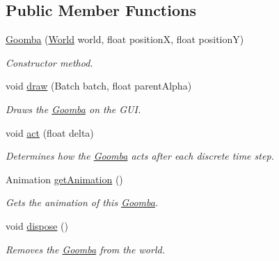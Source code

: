 \subsection*{Public Member Functions}
\begin{DoxyCompactItemize}
\item 
\hyperlink{classnl_1_1arjanfrans_1_1mario_1_1model_1_1Goomba_a71ffe3210dc6f4cfb0ea89ef714d5b2c}{Goomba} (\hyperlink{classnl_1_1arjanfrans_1_1mario_1_1model_1_1World}{World} world, float positionX, float positionY)
\begin{DoxyCompactList}\small\item\em Constructor method. \end{DoxyCompactList}\item 
void \hyperlink{classnl_1_1arjanfrans_1_1mario_1_1model_1_1Goomba_a36a01fff5535bd6629b4dd03ae452e63}{draw} (Batch batch, float parent\+Alpha)
\begin{DoxyCompactList}\small\item\em Draws the \hyperlink{classnl_1_1arjanfrans_1_1mario_1_1model_1_1Goomba}{Goomba} on the G\+UI. \end{DoxyCompactList}\item 
void \hyperlink{classnl_1_1arjanfrans_1_1mario_1_1model_1_1Goomba_ab0215022ef047cd9d82a8fd0447f4a38}{act} (float delta)
\begin{DoxyCompactList}\small\item\em Determines how the \hyperlink{classnl_1_1arjanfrans_1_1mario_1_1model_1_1Goomba}{Goomba} acts after each discrete time step. \end{DoxyCompactList}\item 
Animation \hyperlink{classnl_1_1arjanfrans_1_1mario_1_1model_1_1Goomba_a6d868ec59ecf46f1562a39ffe521e355}{get\+Animation} ()
\begin{DoxyCompactList}\small\item\em Gets the animation of this \hyperlink{classnl_1_1arjanfrans_1_1mario_1_1model_1_1Goomba}{Goomba}. \end{DoxyCompactList}\item 
\mbox{\label{classnl_1_1arjanfrans_1_1mario_1_1model_1_1Goomba_a0167198d965a03dd35bbbf711962f02c}} 
void \hyperlink{classnl_1_1arjanfrans_1_1mario_1_1model_1_1Goomba_a0167198d965a03dd35bbbf711962f02c}{dispose} ()
\begin{DoxyCompactList}\small\item\em Removes the \hyperlink{classnl_1_1arjanfrans_1_1mario_1_1model_1_1Goomba}{Goomba} from the world. \end{DoxyCompactList}\end{DoxyCompactItemize}
